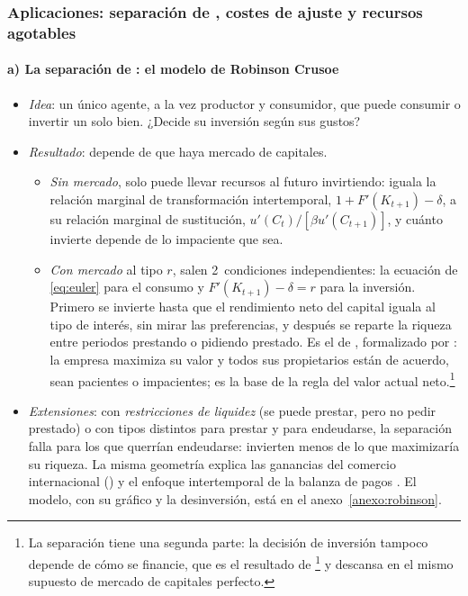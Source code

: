 \documentclass[11pt]{article}
\begin{document}
\subsubsection{Aplicaciones:\cortetitulo{} separación de , costes de ajuste y recursos agotables}\label{sec:aplicaciones-empresa}

\paragraph{a) La separación de : el modelo de Robinson Crusoe}

\begin{itemize}
\item \emph{Idea}: un único agente, a la vez productor y consumidor, que puede consumir o invertir un solo bien. ¿Decide su inversión según sus gustos?
\item \emph{Resultado}: depende de que haya mercado de capitales.
  \begin{itemize}
  \item \emph{Sin mercado}, solo puede llevar recursos al futuro invirtiendo: iguala la relación marginal de transformación intertemporal, $1+F'(K_{t+1})-\delta$, a su relación marginal de sustitución, $u'(C_t)/[\beta u'(C_{t+1})]$, y cuánto invierte depende de lo impaciente que sea.
  \item \emph{Con mercado} al tipo $r$, salen 2~condiciones independientes: la ecuación de  \eqref{eq:euler} para el consumo y $F'(K_{t+1})-\delta=r$ para la inversión. Primero se invierte hasta que el rendimiento neto del capital iguala al tipo de interés, sin mirar las preferencias, y después se reparte la riqueza entre periodos prestando o pidiendo prestado. Es el  de \textcite{Fisher1930Theory}, formalizado por \textcite{Hirshleifer1958Optimal}: la empresa maximiza su valor y todos sus propietarios están de acuerdo, sean pacientes o impacientes; es la base de la regla del valor actual neto.\footnote{La separación tiene una segunda parte: la decisión de inversión tampoco depende de cómo se financie, que es el resultado de \textcite{ModiglianiMiller1958Cost}\footnote{ recibió el Premio Nobel de Economía en 1990, con  y , «por sus trabajos pioneros en la teoría de la economía financiera»\nocite{Nobel1990Markowitz}.} y descansa en el mismo supuesto de mercado de capitales perfecto.}
  \end{itemize}
\item \emph{Extensiones}: con \emph{restricciones de liquidez} (se puede prestar, pero no pedir prestado) o con tipos distintos para prestar y para endeudarse, la separación falla para los que querrían endeudarse: invierten menos de lo que maximizaría su riqueza. La misma geometría explica las ganancias del comercio internacional ()  y el enfoque intertemporal de la balanza de pagos . El modelo, con su gráfico y la desinversión, está en el anexo~\ref{anexo:robinson}.
\end{itemize}
\end{document}
